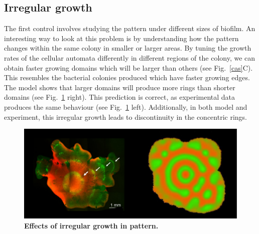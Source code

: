 \subsection{Irregular growth}
The first control involves studying the pattern under different sizes of biofilm.
An interesting way to look at this problem is by understanding how the pattern changes within the same colony in smaller or larger areas.
By tuning the growth rates of the cellular automata differently in different regions of the colony, we can obtain faster growing domains which will be larger than others (see Fig.~\ref{cas}C).
This resembles the bacterial colonies produced which have faster growing edges.
The model shows that larger domains will produce more rings than shorter domains (see Fig.~\ref{fig:irregular growth} right).
This prediction is correct, as experimental data produces the same behaviour  (see Fig.~\ref{fig:irregular growth} left).
Additionally, in both model and experiment, this irregular growth leads to discontinuity in the concentric rings.
\begin{figure}[H] %
    \centering
    \begin{adjustbox}{center}
        \includegraphics[width=1\textwidth]{chapters/Chapter 3/irregular growth} %
    \end{adjustbox}
    \caption{\textbf{Effects of irregular growth in pattern.} }
    \label{fig:irregular growth}
\end{figure}


